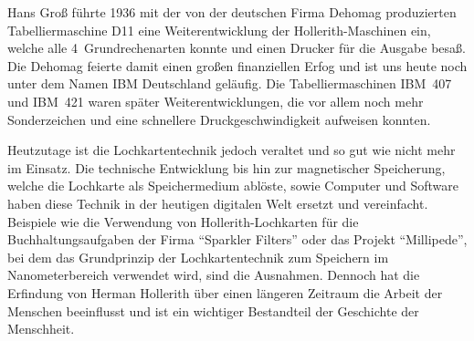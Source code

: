 \documentclass[parskip=half]{scrartcl}
\begin{document}
Hans Groß führte 1936 mit der von der deutschen Firma Dehomag produzierten
Tabelliermaschine D11 eine Weiterentwicklung der Hollerith-Maschinen ein,
welche alle 4~Grundrechenarten konnte und einen Drucker für die Ausgabe besaß.
Die Dehomag feierte damit einen großen finanziellen Erfog und ist uns heute
noch unter dem Namen IBM Deutschland geläufig. Die Tabelliermaschinen IBM~407
und IBM~421 waren später Weiterentwicklungen, die vor allem noch mehr
Sonderzeichen und eine schnellere Druckgeschwindigkeit aufweisen konnten.

Heutzutage ist die Lochkartentechnik jedoch veraltet und so gut wie nicht mehr
im Einsatz. Die technische Entwicklung bis hin zur magnetischer Speicherung,
welche die Lochkarte als Speichermedium ablöste, sowie Computer und Software
haben diese Technik in der heutigen digitalen Welt ersetzt und vereinfacht.
Beispiele wie die Verwendung von Hollerith-Lochkarten für die
Buchhaltungsaufgaben der Firma \enquote{Sparkler Filters} oder das Projekt
\enquote{Millipede}, bei dem das Grundprinzip der Lochkartentechnik zum
Speichern im Nanometerbereich verwendet wird, sind die Ausnahmen. Dennoch hat
die Erfindung von Herman Hollerith über einen längeren Zeitraum die Arbeit der
Menschen beeinflusst und ist ein wichtiger Bestandteil der Geschichte der
Menschheit.


\printbibliography
\end{document}
